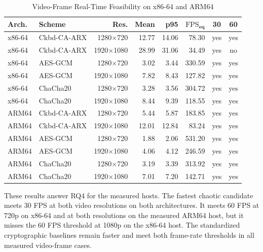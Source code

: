 \documentclass[twocolumn,runningheads]{svjour3}
\begin{document}
\begin{table}[t]
\caption{Video-Frame Real-Time Feasibility on x86-64 and ARM64}
\label{tab:realtime-video}
\centering
\tiny
\setlength{\tabcolsep}{1.5pt}
\begin{tabular}{@{}llrrrrcc@{}}
\toprule
\textbf{Arch.} & \textbf{Scheme} & \textbf{Res.} &
\textbf{Mean} & \textbf{p95} & $\boldsymbol{\mathrm{FPS}_{eq}}$ &
\textbf{30} & \textbf{60} \\
\midrule
x86-64 & Ckbd-CA-ARX & 1280$\times$720 & 12.77 & 14.06 & 78.30 & yes & yes \\
x86-64 & Ckbd-CA-ARX & 1920$\times$1080 & 28.99 & 31.06 & 34.49 & yes & no \\
x86-64 & AES-GCM & 1280$\times$720 & 3.02 & 3.44 & 330.59 & yes & yes \\
x86-64 & AES-GCM & 1920$\times$1080 & 7.82 & 8.43 & 127.82 & yes & yes \\
x86-64 & ChaCha20 & 1280$\times$720 & 3.28 & 3.56 & 304.72 & yes & yes \\
x86-64 & ChaCha20 & 1920$\times$1080 & 8.44 & 9.39 & 118.55 & yes & yes \\
ARM64 & Ckbd-CA-ARX & 1280$\times$720 & 5.44 & 5.87 & 183.85 & yes & yes \\
ARM64 & Ckbd-CA-ARX & 1920$\times$1080 & 12.01 & 12.84 & 83.24 & yes & yes \\
ARM64 & AES-GCM & 1280$\times$720 & 1.88 & 2.06 & 531.20 & yes & yes \\
ARM64 & AES-GCM & 1920$\times$1080 & 4.06 & 4.12 & 246.59 & yes & yes \\
ARM64 & ChaCha20 & 1280$\times$720 & 3.19 & 3.39 & 313.92 & yes & yes \\
ARM64 & ChaCha20 & 1920$\times$1080 & 7.01 & 7.20 & 142.71 & yes & yes \\
\bottomrule
\end{tabular}
\end{table}

These results answer RQ4 for the measured hosts. The fastest chaotic candidate
meets 30 FPS at both video resolutions on both architectures. It meets 60 FPS
at 720p on x86-64 and at both resolutions on the measured ARM64 host, but it
misses the 60 FPS threshold at 1080p on the x86-64 host. The standardized
cryptographic baselines remain faster and meet both frame-rate thresholds in
all measured video-frame cases.
\end{document}
